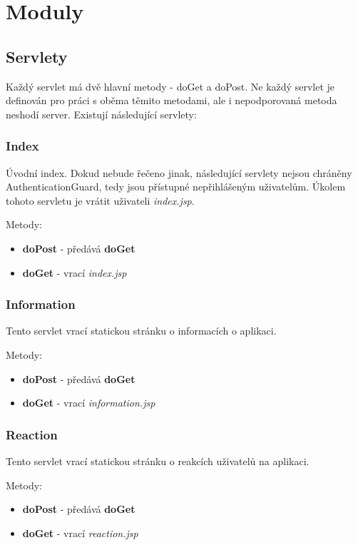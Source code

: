 \documentclass[
12pt,
a4paper,
pdftex,
czech,
titlepage
]{report}
\begin{document}
\chapter{Moduly}

\section{Servlety}

Každý servlet má dvě hlavní metody - doGet a doPost. Ne každý servlet je definován pro práci s oběma těmito metodami, ale i nepodporovaná metoda neshodí server. Existují následující servlety:

\subsection{Index}

Úvodní index. Dokud nebude řečeno jinak, následující servlety nejsou chráněny AuthenticationGuard, tedy jsou přístupné nepřihlášeným uživatelům. Úkolem tohoto servletu je vrátit uživateli \textit{index.jsp}.

Metody:
\begin{itemize}
\item \textbf{doPost} - předává \textbf{doGet}
\item \textbf{doGet} - vrací \textit{index.jsp}
\end{itemize}

\subsection{Information}

Tento servlet vrací statickou stránku o informacích o aplikaci.

Metody:
\begin{itemize}
\item \textbf{doPost} - předává \textbf{doGet}
\item \textbf{doGet} - vrací \textit{information.jsp}
\end{itemize}

\subsection{Reaction}

Tento servlet vrací statickou stránku o reakcích uživatelů na aplikaci.

Metody:
\begin{itemize}
\item \textbf{doPost} - předává \textbf{doGet}
\item \textbf{doGet} - vrací \textit{reaction.jsp}
\end{itemize}
\end{document}
